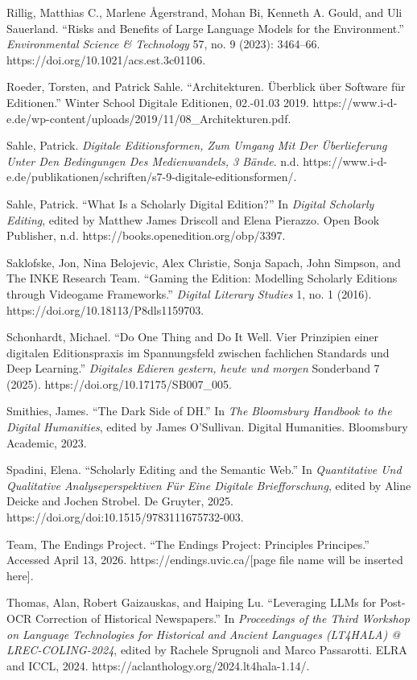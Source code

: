 \documentclass[
  letterpaper,
  DIV=11,
  numbers=noendperiod]{scrreprt}
\begin{document}
Rillig, Matthias C., Marlene Ågerstrand, Mohan Bi, Kenneth A. Gould, and
Uli Sauerland. ``Risks and Benefits of Large Language Models for the
Environment.'' \emph{Environmental Science \& Technology} 57, no. 9
(2023): 3464--66. https://doi.org/10.1021/acs.est.3c01106.

Roeder, Torsten, and Patrick Sahle. ``Architekturen. Überblick über
Software für Editionen.'' Winter School Digitale Editionen, 02.-01.03
2019.
https://www.i-d-e.de/wp-content/uploads/2019/11/08\_Architekturen.pdf.

Sahle, Patrick. \emph{Digitale Editionsformen, Zum Umgang Mit Der
Überlieferung Unter Den Bedingungen Des Medienwandels, 3 Bände}. n.d.
https://www.i-d-e.de/publikationen/schriften/s7-9-digitale-editionsformen/.

Sahle, Patrick. ``What Is a Scholarly Digital Edition?'' In
\emph{Digital Scholarly Editing}, edited by Matthew James Driscoll and
Elena Pierazzo. Open Book Publisher, n.d.
https://books.openedition.org/obp/3397.

Saklofske, Jon, Nina Belojevic, Alex Christie, Sonja Sapach, John
Simpson, and The INKE Research Team. ``Gaming the Edition: Modelling
Scholarly Editions through Videogame Frameworks.'' \emph{Digital
Literary Studies} 1, no. 1 (2016).
https://doi.org/10.18113/P8dls1159703.

Schonhardt, Michael. ``Do One Thing and Do It Well. Vier Prinzipien
einer digitalen Editionspraxis im Spannungsfeld zwischen fachlichen
Standards und Deep Learning.'' \emph{Digitales Edieren gestern, heute
und morgen} Sonderband 7 (2025). https://doi.org/10.17175/SB007\_005.

Smithies, James. ``The Dark Side of DH.'' In \emph{The Bloomsbury
Handbook to the Digital Humanities}, edited by James O'Sullivan. Digital
Humanities. Bloomsbury Academic, 2023.

Spadini, Elena. ``Scholarly Editing and the Semantic Web.'' In
\emph{Quantitative Und Qualitative Analyseperspektiven Für Eine Digitale
Briefforschung}, edited by Aline Deicke and Jochen Strobel. De Gruyter,
2025. https://doi.org/doi:10.1515/9783111675732-003.

Team, The Endings Project. ``The Endings Project: Principles \textbar{}
Principes.'' Accessed April 13, 2026. https://endings.uvic.ca/{[}page
file name will be inserted here{]}.

Thomas, Alan, Robert Gaizauskas, and Haiping Lu. ``Leveraging LLMs for
Post-OCR Correction of Historical Newspapers.'' In \emph{Proceedings of
the Third Workshop on Language Technologies for Historical and Ancient
Languages (LT4HALA) @ LREC-COLING-2024}, edited by Rachele Sprugnoli and
Marco Passarotti. ELRA and ICCL, 2024.
https://aclanthology.org/2024.lt4hala-1.14/.
\end{document}
